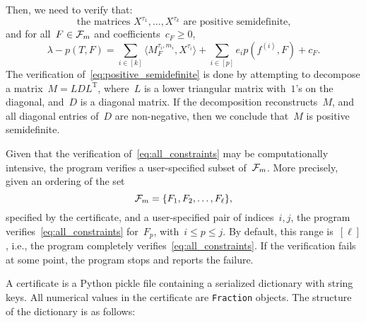 \documentclass[11pt,a4paper,reqno]{amsart}
\begin{document}
Then, we need to verify that:
\begin{equation}
  \label{eq:positive_semidefinite}
  \text{the matrices } X^{\tau_1}, \dots, X^{\tau_k} \text{ are positive semidefinite,}
\end{equation}
and for all~$F \in {\mathcal F}_m$ and coefficients~$c_F \geq 0$,
\begin{equation}
  \label{eq:all_constraints}
  \lambda - p(T, F) = \sum_{i \in [k]} \langle M_F^{\tau_i, m_i}, X^{\tau_i}\rangle + \sum_{i \in [p]} e_i p(f^{(i)}, F) + c_F.
\end{equation}
The verification of~\eqref{eq:positive_semidefinite} is done by attempting to decompose a
matrix~$M = LDL^{\text{T}}$, where~$L$ is a lower triangular matrix with~$1$'s on the
diagonal, and~$D$ is a diagonal matrix. If the decomposition reconstructs~$M$, and
all diagonal entries of~$D$ are non-negative, then we conclude that~$M$ is positive
semidefinite.

Given that the verification of~\eqref{eq:all_constraints} may be computationally
intensive, the program verifies a user-specified subset of~${\mathcal F}_m$. More precisely,
given an ordering of the set
\begin{equation}
  \label{eq:zero_flags}
  \cF_m = \set{F_1, F_2, \dots, F_\ell},
\end{equation}
specified by the certificate, and a user-specified pair of indices~$i, j$, the
program verifies~\eqref{eq:all_constraints} for~$F_p$, with~$i \leq p \leq j$. By default, this range
is~$[\ell]$, i.e., the program completely verifies~\eqref{eq:all_constraints}. If the
verification fails at some point, the program stops and reports the failure.

A certificate is a Python pickle file containing a serialized dictionary with string
keys. All numerical values in the certificate are \verb|Fraction| objects. The
structure of the dictionary is as follows:
\end{document}
